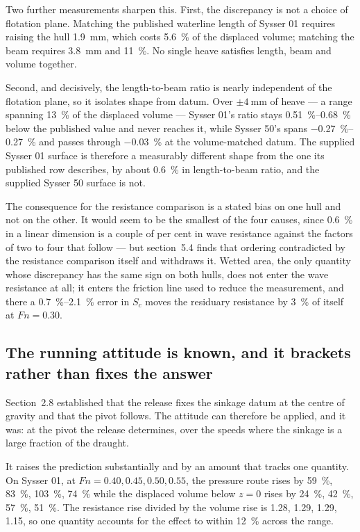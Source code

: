 \documentclass[11pt]{article}
\newcommand{\Fn}{\mathit{Fn}}
\begin{document}
Two further measurements sharpen this. First, the discrepancy is not a choice of flotation
plane. Matching the published waterline length of Sysser 01 requires raising the hull
\SI{1.9}{\milli\metre}, which costs \SI{5.6}{\percent} of the displaced volume; matching the
beam requires \SI{3.8}{\milli\metre} and \SI{11}{\percent}. No single heave satisfies length,
beam and volume together.

Second, and decisively, the length-to-beam ratio is nearly independent of the flotation
plane, so it isolates shape from datum. Over $\pm\SI{4}{\milli\metre}$ of heave --- a range
spanning \SI{13}{\percent} of the displaced volume --- Sysser 01's ratio stays
\SIrange{0.51}{0.68}{\percent} below the published value and never reaches it, while
Sysser 50's spans \SIrange{-0.27}{0.27}{\percent} and passes through
\SI{-0.03}{\percent} at the volume-matched datum. The supplied Sysser 01 surface is
therefore a measurably different shape from the one its published row describes, by about
\SI{0.6}{\percent} in length-to-beam ratio, and the supplied Sysser 50 surface is not.

The consequence for the resistance comparison is a stated bias on one hull and not on the
other. It would seem to be the smallest of the four causes, since \SI{0.6}{\percent} in a
linear dimension is a couple of per cent in wave resistance against the factors of two to four
that follow --- but section~5.4 finds that ordering contradicted by the resistance comparison
itself and withdraws it.
Wetted area, the only quantity whose discrepancy has the same sign on both hulls, does not
enter the wave resistance at all; it enters the friction line used to reduce the measurement,
and there a \SIrange{0.7}{2.1}{\percent} error in $S_c$ moves the residuary resistance by
\SI{3}{\percent} of itself at $\Fn = 0.30$.

\subsection{The running attitude is known, and it brackets rather than fixes the answer}

Section~2.8 established that the release fixes the sinkage datum at the centre of gravity and
that the pivot follows. The attitude can therefore be applied, and it was: at the pivot the
release determines, over the speeds where the sinkage is a large fraction of the draught.

It raises the prediction substantially and by an amount that tracks one quantity.
On Sysser 01, at $\Fn = 0.40, 0.45, 0.50, 0.55$, the pressure route rises by \SI{59}{\percent}, \SI{83}{\percent}, \SI{103}{\percent}, \SI{74}{\percent} while the displaced volume below $z = 0$ rises by \SI{24}{\percent}, \SI{42}{\percent}, \SI{57}{\percent}, \SI{51}{\percent}. The resistance rise divided by the volume rise is \num{1.28}, \num{1.29}, \num{1.29}, \num{1.15}, so one quantity accounts for the effect to within \SI{12}{\percent} across the range.
\end{document}
